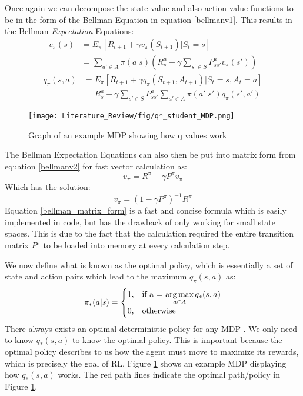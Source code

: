 Once again we can decompose the state value and also action value functions to be in the form of the Bellman Equation in equation \ref{bellmanv1}. This results in the Bellman \textit{Expectation} Equations:
\begin{align}
	v_{\pi}(s)	&= E_{\pi}[R_{t+1} + \gamma v_{\pi}(S_{t+1})|S_t = s]\\
	&= \sum_{a'\in A}\pi(a|s)(R^{a}_s+\gamma\sum_{s'\in S}P^{a}_{ss'}v_\pi(s'))
	\label{bellmanv2}
\end{align}
\begin{align}
	q_{\pi}(s,a)	&= E_{\pi}[R_{t+1} + \gamma q_{\pi}(S_{t+1},A_{t+1})|S_t = s,A_t = a]\\
	&= R^{a}_s +\gamma \sum_{s'\in S}P^{a}_{ss'}\sum_{a'\in A}\pi(a'|s')q_\pi(s',a')
	\label{bellmanq}
\end{align}

\begin{figure}[!htb]
	\centering
	\texttt{[image: Literature\_Review/fig/q*\_student\_MDP.png]}
	\caption{Graph of an example MDP showing how q values work\cite{David_Silver}}
	\label{fig:q*}
	\centering
\end{figure}
The Bellman Expectation Equations can also then be put into matrix form from equation \ref{bellmanv2} for fast vector calculation as:
\begin{equation}
	v_\pi = R^{\pi} + \gamma P^{\pi}v_\pi
\end{equation}
Which has the solution:
\begin{equation}
	v_\pi = (1 - \gamma P^{\pi})^{-1}R^{\pi}
	\label{bellman_matrix_form}
\end{equation}
Equation \ref{bellman_matrix_form} is a fast and concise formula which is easily implemented in code, but has the drawback of only working for small state spaces. This is due to the fact that the calculation required the entire transition matrix $P^\pi$ to be loaded into memory at every calculation step.

We now define what is known as the optimal policy, which is essentially a set of state and action pairs which lead to the maximum $q_\pi(s,a)$ as:
\begin{align}
	\pi_{*}(a|s)=\begin{cases}
		1, & \text{if a = $\operatorname*{arg\,max}\limits_{a \in A}q_* (s,a)$}\\
		0, & \text{otherwise}
	\end{cases}
	\label{eq:pi_*}
\end{align}
There always exists an optimal deterministic policy for any MDP \cite{sutton_barto}. We only need to know $q_* (s,a)$ to know the optimal policy. This is important because the optimal policy describes to us how the agent must move to maximize its rewards, which is precisely the goal of RL. Figure \ref{fig:q*} shows an example MDP displaying how $q_* (s,a)$ works. The red path lines indicate the optimal path/policy in Figure \ref{fig:q*}.

